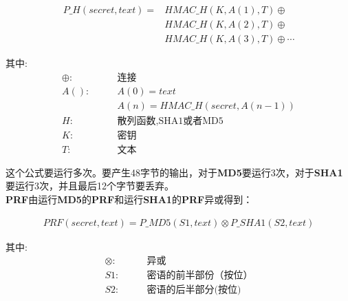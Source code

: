 \documentclass[11pt]{article}
\newcommand{\bfs}[1]{{\bf{#1}}}
\begin{document}
\begin{eqnarray}
        P\_H(secret, text) =& HMAC\_H(K,A(1),T)\oplus {} \nonumber\\
                           &HMAC\_H(K,A(2),T)\oplus  \nonumber \\
                           &HMAC\_H(K,A(3),T)\oplus \cdots \nonumber
\end{eqnarray}

\begin{center}
\begin{minipage}[t]{0.4\textwidth}
        其中:
\begin{align*}
        \oplus:\qquad &\text{连接}\\
            A():\qquad &A(0) = text {} \\
                 \qquad& A(n) = HMAC\_H(secret,A(n-1)) {} \\
              H: \qquad &\text{散列函数,SHA1或者MD5} {}\\
              K: \qquad &\text{密钥} {}\\
              T: \qquad &\text{文本} {}
\end{align*}
\end{minipage}
\end{center}

这个公式要运行多次。要产生48字节的输出，对于\bfs{MD5}要运行3次，对于\bfs{SHA1}要运行3次，并且最后12个字节要丢弃。\\

\bfs{PRF}由运行\bfs{MD5}的\bfs{PRF}和运行\bfs{SHA1}的\bfs{PRF}异或得到：

\begin{eqnarray}
        PRF(secret,text) =  P\_MD5(S1,text) \otimes P\_SHA1(S2,text) \nonumber
\end{eqnarray}

\begin{center}
        \begin{minipage}[t]{0.4\textwidth}
               其中:
               \begin{align*}
                       \otimes:\qquad &\text{异或} \\
                            S1:\qquad &\text{密语的前半部份（按位}）\\
                            S2:\qquad &\text{密语的后半部分(按位)}
               \end{align*}

       \end{minipage}
\end{center}
\end{document}
